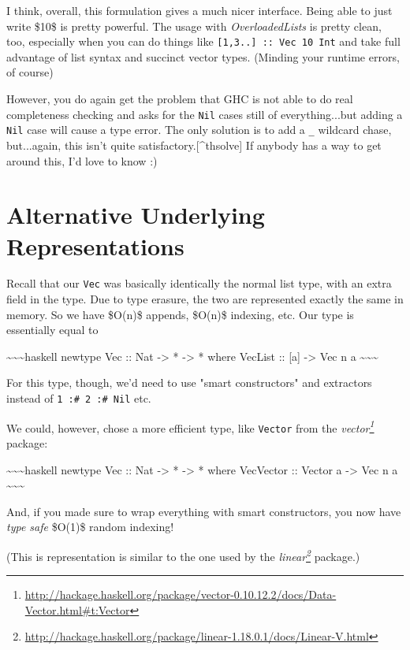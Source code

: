 \documentclass[]{article}
\renewcommand{\href}[2]{#2\footnote{\url{#1}}}
\begin{document}
I think, overall, this formulation gives a much nicer interface. Being able to
just write \$10\$ is pretty powerful. The usage with \emph{OverloadedLists} is
pretty clean, too, especially when you can do things like
\texttt{{[}1,3..{]}\ ::\ Vec\ 10\ Int} and take full advantage of list syntax
and succinct vector types. (Minding your runtime errors, of course)

However, you do again get the problem that GHC is not able to do real
completeness checking and asks for the \texttt{Nil} cases still of
everything...but adding a \texttt{Nil} case will cause a type error. The only
solution is to add a \texttt{\_} wildcard chase, but...again, this isn't quite
satisfactory.{[}\^{}thsolve{]} If anybody has a way to get around this, I'd love
to know :)

\section{Alternative Underlying Representations}

Recall that our \texttt{Vec} was basically identically the normal list type,
with an extra field in the type. Due to type erasure, the two are represented
exactly the same in memory. So we have \$O(n)\$ appends, \$O(n)\$ indexing, etc.
Our type is essentially equal to

\textasciitilde{}\textasciitilde{}\textasciitilde{}haskell newtype Vec :: Nat
-\textgreater{} * -\textgreater{} * where VecList :: {[}a{]} -\textgreater{} Vec
n a \textasciitilde{}\textasciitilde{}\textasciitilde{}

For this type, though, we'd need to use "smart constructors" and extractors
instead of \texttt{1\ :\#\ 2\ :\#\ Nil} etc.

We could, however, chose a more efficient type, like \texttt{Vector} from the
\emph{\href{http://hackage.haskell.org/package/vector-0.10.12.2/docs/Data-Vector.html\#t:Vector}{vector}}
package:

\textasciitilde{}\textasciitilde{}\textasciitilde{}haskell newtype Vec :: Nat
-\textgreater{} * -\textgreater{} * where VecVector :: Vector a -\textgreater{}
Vec n a \textasciitilde{}\textasciitilde{}\textasciitilde{}

And, if you made sure to wrap everything with smart constructors, you now have
\emph{type safe} \$O(1)\$ random indexing!

(This is representation is similar to the one used by the
\emph{\href{http://hackage.haskell.org/package/linear-1.18.0.1/docs/Linear-V.html}{linear}}
package.)
\end{document}
